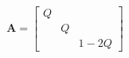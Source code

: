 \begin{equation}
    \mathbf{A} = \left[
    \begin{array}{ccc}
    Q & & \\
    & Q & \\
    & & 1-2Q
    \end{array}
    \right]
\label{eq:emt_depolarization_tensor}
\end{equation}
